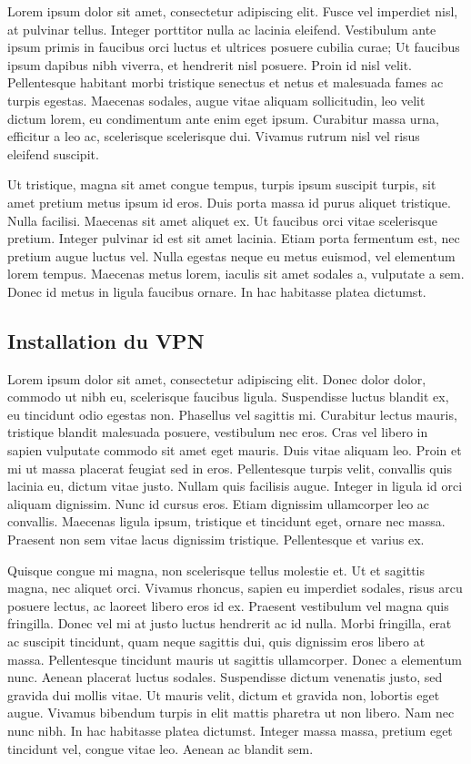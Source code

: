 \documentclass[a4paper,12pt]{report}
\begin{document}
Lorem ipsum dolor sit amet, consectetur adipiscing elit. Fusce vel imperdiet nisl, at pulvinar tellus. Integer porttitor nulla ac lacinia eleifend. Vestibulum ante ipsum primis in faucibus orci luctus et ultrices posuere cubilia curae; Ut faucibus ipsum dapibus nibh viverra, et hendrerit nisl posuere. Proin id nisl velit. Pellentesque habitant morbi tristique senectus et netus et malesuada fames ac turpis egestas. Maecenas sodales, augue vitae aliquam sollicitudin, leo velit dictum lorem, eu condimentum ante enim eget ipsum. Curabitur massa urna, efficitur a leo ac, scelerisque scelerisque dui. Vivamus rutrum nisl vel risus eleifend suscipit.

Ut tristique, magna sit amet congue tempus, turpis ipsum suscipit turpis, sit amet pretium metus ipsum id eros. Duis porta massa id purus aliquet tristique. Nulla facilisi. Maecenas sit amet aliquet ex. Ut faucibus orci vitae scelerisque pretium. Integer pulvinar id est sit amet lacinia. Etiam porta fermentum est, nec pretium augue luctus vel. Nulla egestas neque eu metus euismod, vel elementum lorem tempus. Maecenas metus lorem, iaculis sit amet sodales a, vulputate a sem. Donec id metus in ligula faucibus ornare. In hac habitasse platea dictumst.


\subsection{Installation du VPN} %
Lorem ipsum dolor sit amet, consectetur adipiscing elit. Donec dolor dolor, commodo ut nibh eu, scelerisque faucibus ligula. Suspendisse luctus blandit ex, eu tincidunt odio egestas non. Phasellus vel sagittis mi. Curabitur lectus mauris, tristique blandit malesuada posuere, vestibulum nec eros. Cras vel libero in sapien vulputate commodo sit amet eget mauris. Duis vitae aliquam leo. Proin et mi ut massa placerat feugiat sed in eros. Pellentesque turpis velit, convallis quis lacinia eu, dictum vitae justo. Nullam quis facilisis augue. Integer in ligula id orci aliquam dignissim. Nunc id cursus eros. Etiam dignissim ullamcorper leo ac convallis. Maecenas ligula ipsum, tristique et tincidunt eget, ornare nec massa. Praesent non sem vitae lacus dignissim tristique. Pellentesque et varius ex.

Quisque congue mi magna, non scelerisque tellus molestie et. Ut et sagittis magna, nec aliquet orci. Vivamus rhoncus, sapien eu imperdiet sodales, risus arcu posuere lectus, ac laoreet libero eros id ex. Praesent vestibulum vel magna quis fringilla. Donec vel mi at justo luctus hendrerit ac id nulla. Morbi fringilla, erat ac suscipit tincidunt, quam neque sagittis dui, quis dignissim eros libero at massa. Pellentesque tincidunt mauris ut sagittis ullamcorper. Donec a elementum nunc. Aenean placerat luctus sodales. Suspendisse dictum venenatis justo, sed gravida dui mollis vitae. Ut mauris velit, dictum et gravida non, lobortis eget augue. Vivamus bibendum turpis in elit mattis pharetra ut non libero. Nam nec nunc nibh. In hac habitasse platea dictumst. Integer massa massa, pretium eget tincidunt vel, congue vitae leo. Aenean ac blandit sem.
\end{document}

